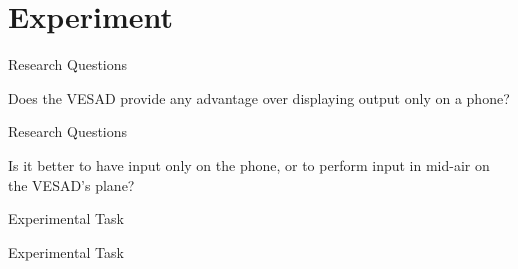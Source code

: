 \section{Experiment}

\begin{frame}{Research Questions}
  \begin{center}
    \Large Does the VESAD provide any advantage over displaying output only on a phone?
  \end{center}
  \vspace{1em}
\end{frame}

\begin{frame}{Research Questions}
  \begin{center}
    \Large Is it better to have input only on the phone, or to perform input in mid-air on the VESAD’s plane?
  \end{center}
  \vspace{2em}
\end{frame}

\begin{frame}{Experimental Task}
\end{frame}

\begin{frame}{Experimental Task}
\end{frame}

